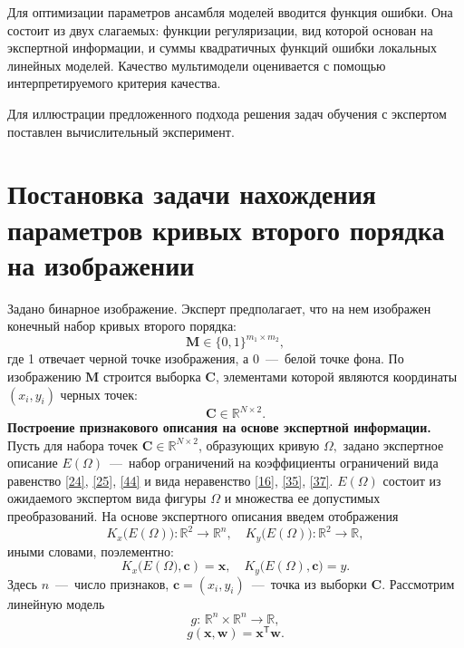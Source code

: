 \documentclass[12pt,twoside]{article}
\begin{document}
Для оптимизации параметров ансамбля моделей вводится функция ошибки. Она состоит из двух слагаемых: функции регуляризации, вид которой основан на экспертной информации, и суммы квадратичных функций ошибки локальных линейных моделей. Качество мультимодели оценивается с помощью интерпретируемого критерия качества.

Для иллюстрации предложенного подхода решения задач обучения с экспертом поставлен вычислительный эксперимент. 
\section{Постановка задачи нахождения параметров кривых второго порядка на изображении}
Задано бинарное изображение. Эксперт предполагает, что на нем изображен конечный набор кривых второго порядка: $$ \mathbf{M} \in \{0, 1 \}^{m_1\times m_2},$$
где 1 отвечает черной точке изображения, а 0~---~белой точке фона. По изображению $\mathbf{M}$ строится выборка $\mathbf{C}$, элементами которой являются координаты $(x_i, y_i)$ черных точек: $$\mathbf{C} \in \mathbb{R}^{N \times 2}.$$
\textbf{Построение признакового описания на основе экспертной информации.} Пусть для набора точек $\mathbf{C} \in \mathbb{R}^{N \times 2}$, образующих кривую $\Omega, $ задано экспертное описание $E(\Omega)$~---~набор ограничений на коэффициенты ограничений вида равенство \eqref{24}, \eqref{25}, \eqref{44} и вида неравенство \eqref{16}, \eqref{35}, \eqref{37}. $E(\Omega)$ состоит из ожидаемого экспертом вида фигуры $\Omega$ и множества ее допустимых преобразований. На основе экспертного описания введем отображения 
\begin{equation}\label{eq1}
K_{x}\bigl(E(\Omega)\bigr): \mathbb{R}^{2} \rightarrow \mathbb{R}^{n}, \quad K_{y}\bigl(E(\Omega)\bigr): \mathbb{R}^{2} \rightarrow \mathbb{R},
\end{equation} 
иными словами, поэлементно:
\begin{equation}\label{eq2}
K_{x}\bigl(E(\Omega\bigr), \mathbf{c}) = \mathbf{x}, \quad  K_{y}\bigl(E(\Omega), \mathbf{c}\bigr) = y
.\end{equation} 
Здесь $n$~---~число признаков, $\mathbf{c} = (x_i, y_i)$~---~точка из выборки $\mathbf{C}$. Рассмотрим линейную модель
\begin{equation}
g: \, \mathbb{R}^n \times \mathbb{R}^n \rightarrow \mathbb{R},
\end{equation}
\begin{equation}\label{eq3}
g(\mathbf{x}, \mathbf{w}) = \mathbf{x}^\mathsf{T} \mathbf{w}.
\end{equation}
\end{document}
